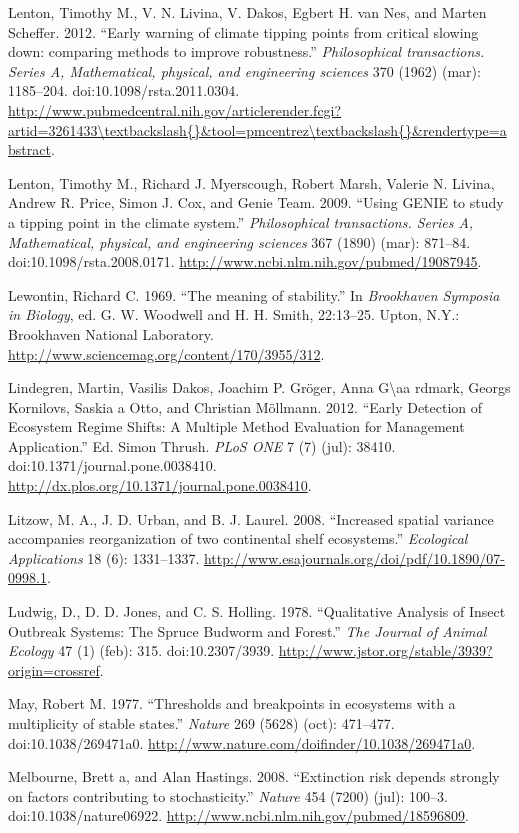 \documentclass[author-year, review]{elsarticle} %
\begin{document}
Lenton, Timothy M., V. N. Livina, V. Dakos, Egbert H. van Nes, and
Marten Scheffer. 2012. ``Early warning of climate tipping points from
critical slowing down: comparing methods to improve robustness.''
\emph{Philosophical transactions. Series A, Mathematical, physical, and
engineering sciences} 370 (1962) (mar): 1185--204.
doi:10.1098/rsta.2011.0304.
\url{http://www.pubmedcentral.nih.gov/articlerender.fcgi?artid=3261433\textbackslash{}\&tool=pmcentrez\textbackslash{}\&rendertype=abstract}.

Lenton, Timothy M., Richard J. Myerscough, Robert Marsh, Valerie N.
Livina, Andrew R. Price, Simon J. Cox, and Genie Team. 2009. ``Using
GENIE to study a tipping point in the climate system.''
\emph{Philosophical transactions. Series A, Mathematical, physical, and
engineering sciences} 367 (1890) (mar): 871--84.
doi:10.1098/rsta.2008.0171.
\url{http://www.ncbi.nlm.nih.gov/pubmed/19087945}.

Lewontin, Richard C. 1969. ``The meaning of stability.'' In
\emph{Brookhaven Symposia in Biology}, ed. G. W. Woodwell and H. H.
Smith, 22:13--25. Upton, N.Y.: Brookhaven National Laboratory.
\url{http://www.sciencemag.org/content/170/3955/312}.

Lindegren, Martin, Vasilis Dakos, Joachim P. Gröger, Anna
G\textbackslash{}aa rdmark, Georgs Kornilovs, Saskia a Otto, and
Christian Möllmann. 2012. ``Early Detection of Ecosystem Regime Shifts:
A Multiple Method Evaluation for Management Application.'' Ed. Simon
Thrush. \emph{PLoS ONE} 7 (7) (jul): 38410.
doi:10.1371/journal.pone.0038410.
\url{http://dx.plos.org/10.1371/journal.pone.0038410}.

Litzow, M. A., J. D. Urban, and B. J. Laurel. 2008. ``Increased spatial
variance accompanies reorganization of two continental shelf
ecosystems.'' \emph{Ecological Applications} 18 (6): 1331--1337.
\url{http://www.esajournals.org/doi/pdf/10.1890/07-0998.1}.

Ludwig, D., D. D. Jones, and C. S. Holling. 1978. ``Qualitative Analysis
of Insect Outbreak Systems: The Spruce Budworm and Forest.'' \emph{The
Journal of Animal Ecology} 47 (1) (feb): 315. doi:10.2307/3939.
\url{http://www.jstor.org/stable/3939?origin=crossref}.

May, Robert M. 1977. ``Thresholds and breakpoints in ecosystems with a
multiplicity of stable states.'' \emph{Nature} 269 (5628) (oct):
471--477. doi:10.1038/269471a0.
\url{http://www.nature.com/doifinder/10.1038/269471a0}.

Melbourne, Brett a, and Alan Hastings. 2008. ``Extinction risk depends
strongly on factors contributing to stochasticity.'' \emph{Nature} 454
(7200) (jul): 100--3. doi:10.1038/nature06922.
\url{http://www.ncbi.nlm.nih.gov/pubmed/18596809}.
\end{document}
